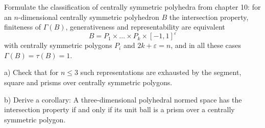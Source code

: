 \documentclass[a4paper,12pt]{report}
\begin{document}
\begin{task}
Formulate the classification of centrally symmetric polyhedra from chapter \textup{10}\textup{:} for an $n$-dimensional centrally symmetric polyhedron $B$ the intersection property, finiteness of $\Gamma(B)$, generativeness and representability are equivalent
\[
B=P_1\times\dots\times P_k\times[-1,1]^\varepsilon
\]
with centrally symmetric polygons $P_i$ and $2k+\varepsilon=n$, and in all these cases $\Gamma(B)=\tau(B)=1$.

\textup{a)} Check that for $n\le3$ such representations are exhausted by the segment, square and prisms over centrally symmetric polygons.

\textup{b)} Derive a corollary\textup{:} A three-dimensional polyhedral normed space has the intersection property if and only if its unit ball is a prism over a centrally symmetric polygon.

\end{task}
\end{document}
